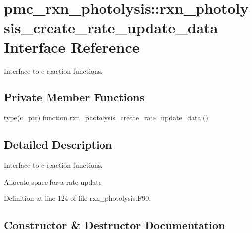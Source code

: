 \hypertarget{interfacepmc__rxn__photolysis_1_1rxn__photolysis__create__rate__update__data}{}\section{pmc\+\_\+rxn\+\_\+photolysis\+:\+:rxn\+\_\+photolysis\+\_\+create\+\_\+rate\+\_\+update\+\_\+data Interface Reference}
\label{interfacepmc__rxn__photolysis_1_1rxn__photolysis__create__rate__update__data}


Interface to c reaction functions.  


\subsection*{Private Member Functions}
\begin{DoxyCompactItemize}
\item 
type(c\+\_\+ptr) function \mbox{\hyperlink{interfacepmc__rxn__photolysis_1_1rxn__photolysis__create__rate__update__data_ab8c4b57443c013906124839ad0593f9a}{rxn\+\_\+photolysis\+\_\+create\+\_\+rate\+\_\+update\+\_\+data}} ()
\end{DoxyCompactItemize}


\subsection{Detailed Description}
Interface to c reaction functions. 

Allocate space for a rate update 

Definition at line 124 of file rxn\+\_\+photolysis.\+F90.



\subsection{Constructor \& Destructor Documentation}
\mbox{\label{interfacepmc__rxn__photolysis_1_1rxn__photolysis__create__rate__update__data_ab8c4b57443c013906124839ad0593f9a}} 
